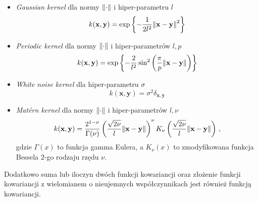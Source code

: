\documentclass{myclass}
\begin{document}
\begin{itemize}
    \item \textit{Gaussian kernel} dla normy \(\norm{\cdot}\) i hiper-parametru \(l\)
    \begin{equation*}
        k(\mathbf{x}, \mathbf{y}) = \exp\left\{-\frac{1}{2l^2}\norm{\mathbf{x} - \mathbf{y}}^2\right\}
    \end{equation*}
    
    \item \textit{Periodic kernel} dla normy \(\norm{\cdot}\) i hiper-parametrów \(l, p\)
    \begin{equation*}
        k(\mathbf{x},\mathbf{y}) = \exp\left\{-\frac{2}{l^2}\sin^2\left(\frac{\pi}{p}\norm{\mathbf{x} - \mathbf{y}}\right)\right\}
    \end{equation*}

    \item \textit{White noise kernel} dla hiper-parametru \(\sigma\)
    \begin{equation*}
        k(\mathbf{x},\mathbf{y}) = \sigma^2 \delta_{\mathbf{x},\mathbf{y}}
    \end{equation*}

    \item \textit{Mat\'ern kernel} dla normy \(\norm{\cdot}\) i hiper-parametrów \(l, \nu\)
    \begin{equation*}
        k(\mathbf{x},\mathbf{y}) = \frac{2^{1-\nu}}{\Gamma(\nu)}\left(\frac{\sqrt{2\nu}}{l}\norm{\mathbf{x} - \mathbf{y}}\right)^\nu K_\nu\left(\frac{\sqrt{2\nu}}{l}\norm{\mathbf{x} - \mathbf{y}}\right)\,,
    \end{equation*}
    gdzie \(\Gamma(x)\) to funkcja gamma Eulera, a \(K_\nu(x)\) to zmodyfikowana funkcja Bessela
    2-go rodzaju rzędu \(\nu\).

\end{itemize}
Dodatkowo suma lub iloczyn dwóch funkcji kowariancji oraz złożenie funkcji kowariancji z wielomianem
o nieujemnych współczynnikach jest również funkcją kowariancji.
\end{document}
